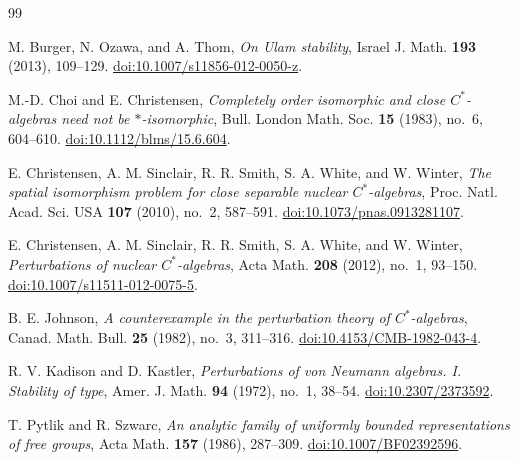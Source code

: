 \begin{thebibliography}{99}

M. Burger, N. Ozawa, and A. Thom,
\emph{On Ulam stability},
Israel J. Math. \textbf{193} (2013), 109--129.
\href{https://doi.org/10.1007/s11856-012-0050-z}{doi:10.1007/s11856-012-0050-z}.

M.-D. Choi and E. Christensen,
\emph{Completely order isomorphic and close $C^*$-algebras need not be
$*$-isomorphic},
Bull. London Math. Soc. \textbf{15} (1983), no.~6, 604--610.
\href{https://doi.org/10.1112/blms/15.6.604}{doi:10.1112/blms/15.6.604}.

E. Christensen, A. M. Sinclair, R. R. Smith, S. A. White, and W. Winter,
\emph{The spatial isomorphism problem for close separable nuclear
$C^*$-algebras},
Proc. Natl. Acad. Sci. USA \textbf{107} (2010), no.~2, 587--591.
\href{https://doi.org/10.1073/pnas.0913281107}{doi:10.1073/pnas.0913281107}.

E. Christensen, A. M. Sinclair, R. R. Smith, S. A. White, and W. Winter,
\emph{Perturbations of nuclear $C^*$-algebras},
Acta Math. \textbf{208} (2012), no.~1, 93--150.
\href{https://doi.org/10.1007/s11511-012-0075-5}{doi:10.1007/s11511-012-0075-5}.

B. E. Johnson,
\emph{A counterexample in the perturbation theory of $C^*$-algebras},
Canad. Math. Bull. \textbf{25} (1982), no.~3, 311--316.
\href{https://doi.org/10.4153/CMB-1982-043-4}{doi:10.4153/CMB-1982-043-4}.

R. V. Kadison and D. Kastler,
\emph{Perturbations of von Neumann algebras. I. Stability of type},
Amer. J. Math. \textbf{94} (1972), no.~1, 38--54.
\href{https://doi.org/10.2307/2373592}{doi:10.2307/2373592}.

T. Pytlik and R. Szwarc,
\emph{An analytic family of uniformly bounded representations of free groups},
Acta Math. \textbf{157} (1986), 287--309.
\href{https://doi.org/10.1007/BF02392596}{doi:10.1007/BF02392596}.

\end{thebibliography}
